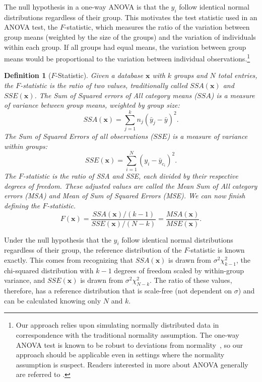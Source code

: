 \documentclass[USenglish,oneside]{article}
\newcounter{ab}
\newcounter{ar}
\newcounter{igh}
\newcounter{ms}
\newtheorem{definition}{Definition}
\newcommand{\dbsize}{\ensuremath{N}\xspace}
\renewcommand{\k}{\ensuremath{k}\xspace}
\newcommand{\mse}{\textit{MSE}\xspace}
\newcommand{\msa}{\textit{MSA}\xspace}
\newcommand{\sse}{\textit{SSE}\xspace}
\newcommand{\ssa}{\textit{SSA}\xspace}
\newcommand{\x}{\ensuremath{\mathbf{x}}\xspace}
\begin{document}
The null hypothesis in a one-way ANOVA is that the $y_i$ follow identical normal distributions regardless of their group. This motivates the test statistic used in an ANOVA test, the $F$-statistic, which measures the ratio of the variation between group means (weighted by the size of the groups) and the variation of individuals within each group. If all groups had equal means, the variation between group means would be proportional to the variation between individual observations.\footnote{Our approach relies upon simulating normally distributed data in correspondence with the traditional normality assumption. The one-way ANOVA test is known to be robust to deviations from normality~\cite{schmider2010}, so our approach should be applicable even in settings where the normality assumption is suspect. Readers interested in more about ANOVA generally are referred to \cite{cox1974theoretical}.}

\begin{definition}[$F$-Statistic] \label{def:fstat}
Given a database \x with $k$ groups and \dbsize total entries, the $F$-statistic is the ratio of two values, traditionally called $\ssa(\x)$ and $\sse(\x)$.  The Sum of Squared errors of All category means ($\ssa$) is a measure of variance between group means, weighted by group size:
\begin{equation*}
\ssa(\x) = \sum_{j=1}^{\k} n_j (\bar{y}_j - \bar{y})^2.
\end{equation*}
The Sum of Squared Errors of all observations ($\sse$) is a measure of variance within groups:
\begin{equation*}
\sse(\x) = \sum_{i=1}^{\dbsize}  (y_{i}-\bar{y}_{c_i})^2.
\end{equation*}
The $F$-statistic is the ratio of \ssa and \sse, each divided by their respective degrees of freedom.  These adjusted values are called  the Mean Sum of All category errors (\msa) and Mean of Sum of Squared Errors (\mse).
We can now finish defining the $F$-statistic.
\begin{equation*}
F(\x)  = \frac{\ssa(\x)/(\k - 1)}{\sse(\x)/(\dbsize - \k)} = \frac{\msa(\x)}{\mse(\x)}.
\end{equation*}
\end{definition}

Under the null hypothesis that the $y_i$ follow identical normal distributions regardless of their group, the reference distribution of the $F$-statistic is known exactly. This comes from recognizing that $\ssa(\x)$ is drawn from $\sigma^2\chi_{\k-1}^2$, the chi-squared distribution with $\k-1$ degrees of freedom scaled by within-group variance, and $\sse(\x)$ is drawn from $\sigma^2 \chi^2_{\dbsize - \k}$.  The ratio of these values, therefore, has a reference distribution that is scale-free (not dependent on $\sigma$) and can be calculated knowing only $N$ and $k$.
\end{document}
